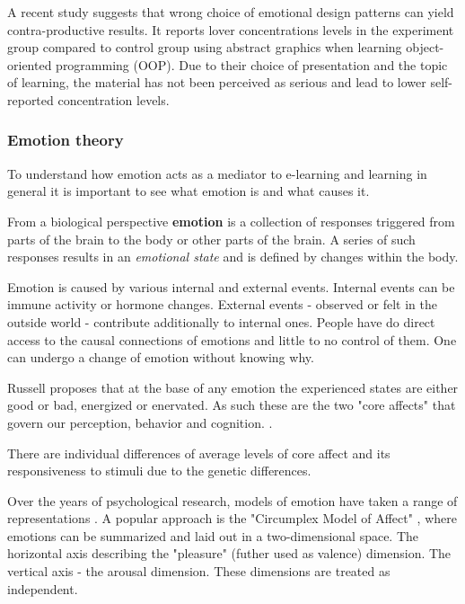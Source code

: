 	A recent study \cite{Haaranen2015} suggests that wrong choice of emotional design patterns can yield contra-productive results. It reports lover concentrations levels in the experiment group compared to control group using abstract graphics when learning object-oriented programming (OOP). Due to their choice of presentation and the topic of learning, the material has not been perceived as serious and lead to lower self-reported concentration levels.
		
		\subsubsection{Emotion theory} \label{sec:emotion-theory}
		
		To understand how emotion acts as a mediator to e-learning and learning in general it is important to see what emotion is and what causes it.
		
		From a biological perspective \textbf{emotion} is a collection of responses triggered from parts of the brain to the body or other parts of the brain. A series of such responses results in an \textit{emotional state} and is defined by changes within the body. \cite{Damasio1998}
	
		Emotion is caused by various internal and external events. Internal events can be immune activity or hormone changes. External events - observed or felt in the outside world - contribute additionally to internal ones. People have do direct access to the causal connections of emotions and little to no control of them. One can undergo a change of emotion without knowing why. \cite{Russell2003}
		
		Russell proposes that at the base of any emotion the experienced states are either good or bad, energized or enervated. As such these are the two "core affects" that govern our perception, behavior and cognition. \cite{Russell2003}. 
		
		There are individual differences of average levels of core affect and its responsiveness to stimuli due to the genetic differences. \cite{Russell2003}
		
		Over the years of psychological research, models of emotion have taken a range of representations \cite{SreejaPSMahalakshmi2017}.
		A popular approach is the "Circumplex Model of Affect" \cite{Russell1980}, where emotions can be summarized and laid out in a two-dimensional space. The horizontal axis describing the "pleasure" (futher used as valence) dimension. The vertical axis - the arousal dimension. These dimensions are treated as independent.
		
